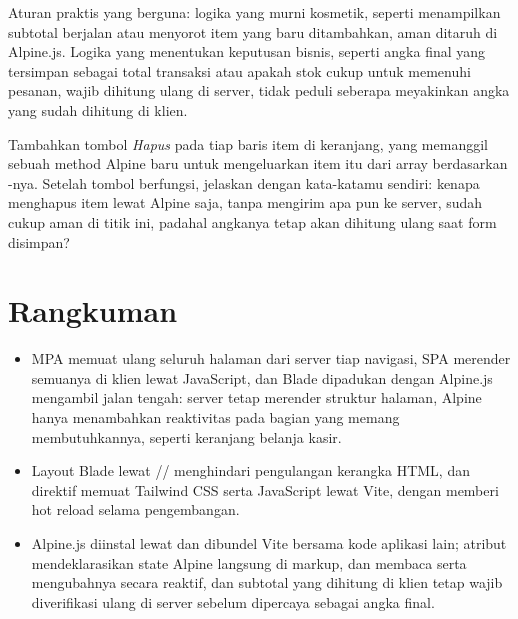 \begin{tipbox}
Aturan praktis yang berguna: logika yang murni kosmetik, seperti
menampilkan subtotal berjalan atau menyorot item yang baru ditambahkan,
aman ditaruh di Alpine.js. Logika yang menentukan keputusan bisnis, seperti
angka final yang tersimpan sebagai total transaksi atau apakah stok cukup
untuk memenuhi pesanan, wajib dihitung ulang di server, tidak peduli seberapa
meyakinkan angka yang sudah dihitung di klien.
\end{tipbox}

\begin{challengebox}
Tambahkan tombol \textit{Hapus} pada tiap baris item di keranjang, yang
memanggil sebuah method Alpine baru untuk mengeluarkan item itu dari array
 berdasarkan -nya. Setelah tombol berfungsi, jelaskan
dengan kata-katamu sendiri: kenapa menghapus item lewat Alpine saja, tanpa
mengirim apa pun ke server, sudah cukup aman di titik ini, padahal
angkanya tetap akan dihitung ulang saat form disimpan?
\end{challengebox}


\section{Rangkuman}
\label{sec:blade-dan-tailwind-rangkuman}

\begin{itemize}
  \item MPA memuat ulang seluruh halaman dari server tiap navigasi, SPA
    merender semuanya di klien lewat JavaScript, dan Blade dipadukan dengan
    Alpine.js mengambil jalan tengah: server tetap merender struktur
    halaman, Alpine hanya menambahkan reaktivitas pada bagian yang memang
    membutuhkannya, seperti keranjang belanja kasir.
  \item Layout Blade lewat //
    menghindari pengulangan kerangka HTML, dan direktif  memuat
    Tailwind CSS serta JavaScript lewat Vite, dengan 
    memberi hot reload selama pengembangan.
  \item Alpine.js diinstal lewat  dan dibundel
    Vite bersama kode aplikasi lain; atribut  mendeklarasikan
    state Alpine langsung di markup,  dan  membaca
    serta mengubahnya secara reaktif, dan subtotal yang dihitung di klien
    tetap wajib diverifikasi ulang di server sebelum dipercaya sebagai
    angka final.
\end{itemize}

